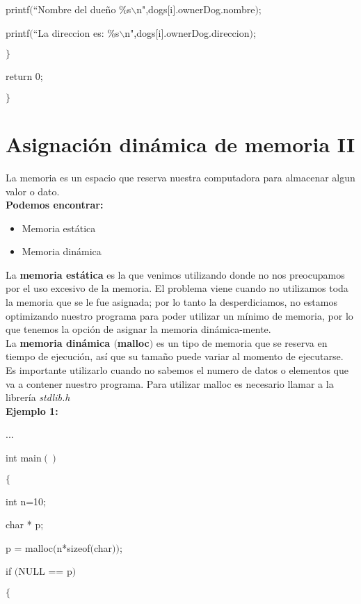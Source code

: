 \documentclass[]{article}
\begin{document}
	printf$($``Nombre del dueño \%s$\backslash$n",dogs$[$i$]$.ownerDog.nombre$)$;
	
	printf$($``La direccion es: \%s$\backslash$n",dogs$[$i$]$.ownerDog.direccion$)$;
	
	$\rbrace$
	
	return 0;
	
	$\rbrace$
	
	\section{Asignación dinámica de memoria II}
	
	La memoria es un espacio que reserva nuestra computadora para almacenar algun valor o dato.\\
	
	\textbf{Podemos encontrar:}
	
	\begin{itemize}
		\item Memoria estática
		\item Memoria dinámica
	\end{itemize}
	
	La \textbf{memoria estática} es la que venimos utilizando donde no nos preocupamos por el uso excesivo de la memoria. El problema viene cuando no utilizamos toda la memoria que se le fue asignada; por lo tanto la desperdiciamos, no estamos optimizando nuestro programa para poder utilizar un mínimo de memoria, por lo que tenemos la opción de asignar la memoria dinámica-mente.\\
	
	La \textbf{memoria dinámica $($malloc$)$} es un tipo de memoria que se reserva en tiempo de ejecución, así que su tamaño puede variar al momento de ejecutarse. Es importante utilizarlo cuando no sabemos el numero de datos o elementos que va a contener nuestro programa. Para utilizar malloc es necesario llamar a la librería \textit{stdlib.h}\\
	
	\textbf{Ejemplo 1:\\}
	
	...
	
	int main$()$
	
	$\lbrace$
	
	int n=10;
	
	char * p;
	
	p = malloc$($n*sizeof$($char$))$;
	
	if $($NULL == p$)$
	
	$\lbrace$
	
\end{document}
